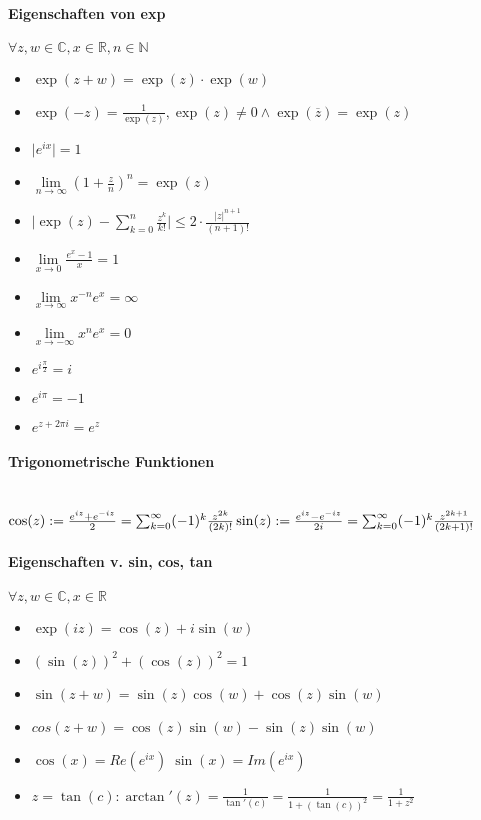 \documentclass[paper=a3,paper=landscape, fontsize=9pt,DIV=25]{scrartcl}
\newcommand{\real}{{\mathbb{R}}}
\newcommand{\compl}{\mathbb{C}}
\newcommand{\nat}{\mathbb{N}}
\begin{document}
\begin{multicols*}{4}
  \paragraph{Eigenschaften von exp}
  $\forall z,w \in \compl, x \in \real, n \in \nat$
  \begin{itemize}
  \item $\exp(z+w)=\exp(z)\cdot \exp(w)$
  \item $\exp(-z)=\frac{1}{\exp(z)}, \exp(z) \neq 0 \wedge \exp(\overline{z})=\exp(z)$
  \item $\lvert e^{ix} \rvert = 1$
  \item $\lim\limits_{n \rightarrow \infty} (1+\frac{z}{n})^n=\exp(z)$
  \item $ \lvert \exp(z)- \sum_{k=0}^{n} \frac{z^k}{k!} \rvert \leq 2 \cdot \frac{\lvert z \rvert ^{n+1}}{(n+1)!}$
  \item $ \lim\limits_{x \rightarrow 0} \frac{e^x-1}{x} = 1$
  \item $ \lim\limits_{x \rightarrow \infty} x^{-n}e^x=\infty$
  \item $ \lim\limits_{x \rightarrow -\infty} x^ne^x=0$
  \item $e^{i \frac{\pi}{2}} = i$
  \item $e^{i\pi}=-1$
  \item $e^{z+2\pi i}=e^z$
  \end{itemize}


  \paragraph{Trigonometrische Funktionen}\hspace{0pt} \\
  $  \cos(z):=\frac{e^{iz}+e^{-iz}}{2} = \sum_{k=0}^{\infty} (-1)^k\frac{z^{2k}}{(2k)!}\\\sin(z):=\frac{e^{iz}-e^{-iz}}{2i} = \sum_{k=0}^{\infty} (-1)^k \frac{z^{2k+1}}{(2k+1)!}$


  \paragraph{Eigenschaften v. sin, cos, tan}
  $\forall z,w \in \compl, x \in \real$

  \begin{itemize}
  \item $\exp(iz) = \cos(z)+i\sin(w)$
  \item $(\sin(z))^2+(\cos(z))^2=1$
  \item $\sin(z+w)=\sin(z)\cos(w)+\cos(z)\sin(w)$
  \item $cos(z+w)=\cos(z)\sin(w)-\sin(z)\sin(w)$
  \item $\cos(x)=Re(e^{ix}) \; \sin(x)=Im(e^{ix})$
  \item $z=\tan(c): \arctan'(z)=\frac{1}{\tan'(c)}=\frac{1}{1+(\tan(c))^2}=\frac{1}{1+z^2}$
  \end{itemize}


\end{multicols*}
\end{document}
